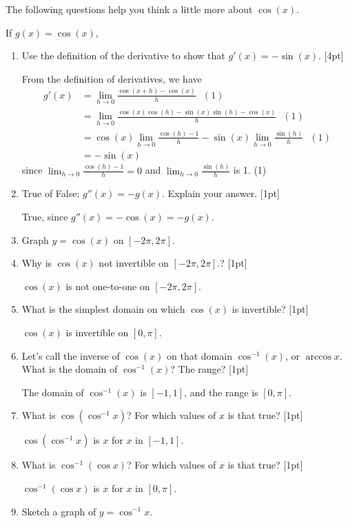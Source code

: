 \documentclass[12pt,twoside]{article}
\begin{document}
The following questions help you think a little more about $\cos(x)$. 

If $g(x) = \cos(x)$, 
\begin{enumerate}
      \item Use the definition of the derivative to show that $g'(x) = -\sin(x)$. [4pt]
      
      From the definition of derivatives, we have 
      \begin{align*}
      g'(x) &= \lim_{h \rightarrow 0} \frac{\cos(x+h) - \cos(x)}{h}  ~~~(1) \\
      & = \lim_{h \rightarrow 0} \frac{ \cos(x)\cos(h) - \sin(x) \sin(h) - \cos(x)}{h} ~~~(1)  \\
      & = \cos(x)  \lim_{h \rightarrow 0} \frac{\cos(h) -1}{h} - \sin(x)  \lim_{h \rightarrow 0} \frac{\sin(h)}{h} ~~~(1) \\
      & = -\sin(x)
      \end{align*}
      since $\lim_{h \rightarrow 0} \frac{\cos(h) -1}{h} = 0 $ and $\lim_{h \rightarrow 0} \frac{\sin(h)}{h}$ is 1. (1)
      
      \item True of False: $g''(x) = -g(x)$. Explain your answer. [1pt]
     
      True, since $g''(x) = -\cos(x) = -g(x)$. 
      
      \item Graph $y = \cos(x)$ on $[-2\pi, 2\pi]$. 
      
      \item Why is $\cos(x)$ not invertible on $[-2\pi, 2\pi]$.? [1pt]
     
      $\cos(x)$ is not one-to-one on $[-2\pi, 2\pi]$. 
      
      \item What is the simplest domain on which $\cos(x)$ is invertible? [1pt]
      
      $\cos(x)$ is invertible on $[0, \pi]$. 
      
      \item Let's call the inverse of $\cos(x)$ on that domain $\cos^{-1}(x)$, or $\arccos x$. What is the domain of $\cos^{-1}(x)$? The range? [1pt]
      
      The domain of $\cos^{-1}(x)$ is $[-1, 1]$, and the range is $[0, \pi]$.
    
      \item What is $\cos(\cos^{-1} x)$? For which values of $x$ is that true? [1pt]
      
      $\cos(\cos^{-1} x)$ is $x$ for $x$ in $[-1, 1]$.
      
      \item What is $\cos^{-1} (\cos x)$? For which values of $x$ is that true? [1pt]
      
      $\cos^{-1} (\cos x)$ is $x$ for $x$ in $[0, \pi]$.
      
      \item Sketch a graph of $y = \cos^{-1} x$. 
\end{enumerate}
\end{document}
